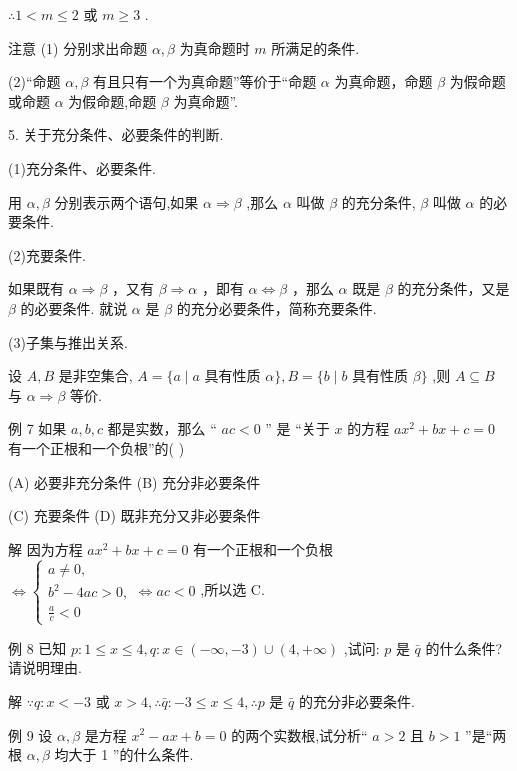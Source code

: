 \documentclass[10pt]{article}
\begin{document}
\(\therefore 1 < m \leq  2\) 或 \(m \geq  3\) .

注意 (1) 分别求出命题 \(\alpha ,\beta\) 为真命题时 \(m\) 所满足的条件.

(2)“命题 \(\alpha ,\beta\) 有且只有一个为真命题”等价于“命题 \(\alpha\) 为真命题，命题 \(\beta\) 为假命题或命题 \(\alpha\) 为假命题,命题 \(\beta\) 为真命题”.

5. 关于充分条件、必要条件的判断.

(1)充分条件、必要条件.

用 \(\alpha ,\beta\) 分别表示两个语句,如果 \(\alpha  \Rightarrow  \beta\) ,那么 \(\alpha\) 叫做 \(\beta\) 的充分条件, \(\beta\) 叫做 \(\alpha\) 的必要条件.

(2)充要条件.

如果既有 \(\alpha  \Rightarrow  \beta\) ，又有 \(\beta  \Rightarrow  \alpha\) ，即有 \(\alpha  \Leftrightarrow  \beta\) ，那么 \(\alpha\) 既是 \(\beta\) 的充分条件，又是 \(\beta\) 的必要条件. 就说 \(\alpha\) 是 \(\beta\) 的充分必要条件，简称充要条件.

(3)子集与推出关系.

设 \(A,B\) 是非空集合, \(A = \{ a \mid  a\) 具有性质 \(\alpha \} ,B = \{ b \mid  b\) 具有性质 \(\beta \}\) ,则 \(A \subseteq  B\) 与 \(\alpha  \Rightarrow  \beta\) 等价.

例 7 如果 \(a,b,c\) 都是实数，那么 “ \({ac} < 0\) ” 是 “关于 \(x\) 的方程 \(a{x}^{2} + {bx} + c = 0\) 有一个正根和一个负根”的( )

(A) 必要非充分条件 (B) 充分非必要条件

(C) 充要条件 (D) 既非充分又非必要条件

解 因为方程 \(a{x}^{2} + {bx} + c = 0\) 有一个正根和一个负根 \(\Leftrightarrow  \left\{  {\begin{array}{l} a \neq  0, \\  {b}^{2} - {4ac} > 0, \\  \frac{a}{c} < 0 \end{array} \Leftrightarrow  {ac} < 0}\right.\) ,所以选 C.

例 8 已知 \(p : 1 \leq  x \leq  4,q : x \in  \left( {-\infty , - 3}\right)  \cup  \left( {4, + \infty }\right)\) ,试问: \(p\) 是 \(\bar{q}\) 的什么条件? 请说明理由.

解 \(\because q : x <  - 3\) 或 \(x > 4,\therefore \bar{q} :  - 3 \leq  x \leq  4,\therefore p\) 是 \(\bar{q}\) 的充分非必要条件.

例 9 设 \(\alpha ,\beta\) 是方程 \({x}^{2} - {ax} + b = 0\) 的两个实数根,试分析“ \(a > 2\) 且 \(b > 1\) ”是“两根 \(\alpha ,\beta\) 均大于 1 ”的什么条件.
\end{document}
